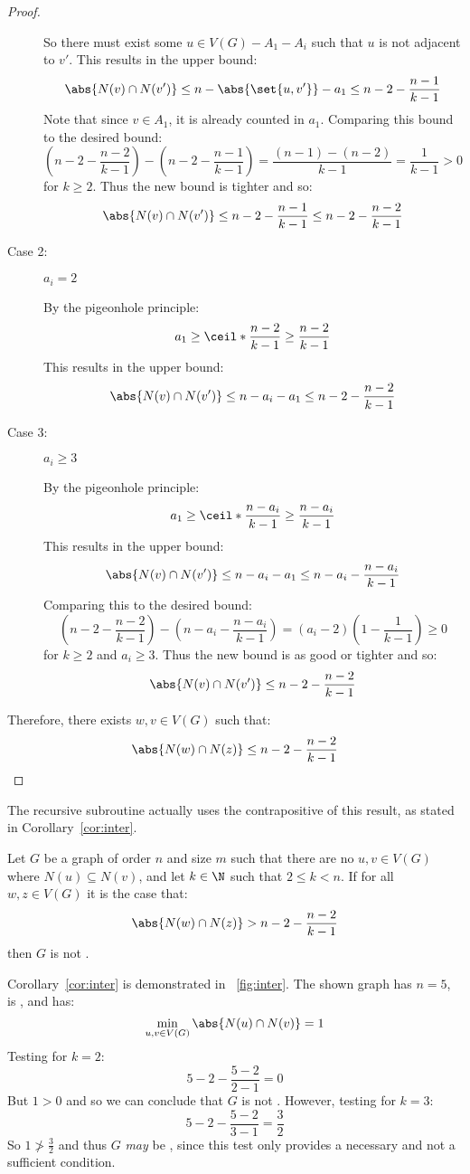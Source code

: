 \begin{proof}
\begin{description}
    So there must exist some \(u\in V(G)-A_1-A_i\) such that \(u\) is not adjacent to \(v'\).  This results in the
    upper bound:
    \[\abs{N(v)\cap N(v')}\le n-\abs{\set{u,v'}}-a_1\le n-2-\frac{n-1}{k-1}\]
    Note that since \(v\in A_1\), it is already counted in \(a_1\).  Comparing this bound to the desired bound:
    \[\left(n-2-\frac{n-2}{k-1}\right)-\left(n-2-\frac{n-1}{k-1}\right)=\frac{(n-1)-(n-2)}{k-1}=\frac{1}{k-1}>0\]
    for \(k\ge2\).  Thus the new bound is tighter and so:
    \[\abs{N(v)\cap N(v')}\le n-2-\frac{n-1}{k-1}\le n-2-\frac{n-2}{k-1}\]
    
  \item [Case 2:] \(a_i=2\)

    By the pigeonhole principle:
    \[a_1\ge\ceil*{\frac{n-2}{k-1}}\ge\frac{n-2}{k-1}\]
    This results in the upper bound:
    \[\abs{N(v)\cap N(v')}\le n-a_i-a_1\le n-2-\frac{n-2}{k-1}\]
    
  \item [Case 3:] \(a_i\ge3\)

    By the pigeonhole principle:
    \[a_1\ge\ceil*{\frac{n-a_i}{k-1}}\ge\frac{n-a_i}{k-1}\]
    This results in the upper bound:
    \[\abs{N(v)\cap N(v')}\le n-a_i-a_1\le n-a_i-\frac{n-a_i}{k-1}\]
    Comparing this to the desired bound:
    \[\left(n-2-\frac{n-2}{k-1}\right)-\left(n-a_i-\frac{n-a_i}{k-1}\right)=(a_i-2)\left(1-\frac{1}{k-1}\right)\ge0\]
    for \(k\ge2\) and \(a_i\ge3\).  Thus the new bound is as good or tighter and so:
    \[\abs{N(v)\cap N(v')}\le n-2-\frac{n-2}{k-1}\]
  \end{description}

  Therefore, there exists \(w,v\in V(G)\) such that:
  \[\abs{N(w)\cap N(z)}\le n-2-\frac{n-2}{k-1}\]
\end{proof}

The recursive subroutine actually uses the contrapositive of this result, as stated in Corollary~\ref{cor:inter}.

\begin{corollary}
  \label{cor:inter}
  Let \(G\) be a graph of order \(n\) and size \(m\) such that there are no \(u,v\in V(G)\) where
  \(N(u)\subseteq N(v)\), and let \(k\in\N\) such that \(2\le k<n\).  If for all \(w,z\in V(G)\) it is the case
  that:
  \[\abs{N(w)\cap N(z)}>n-2-\frac{n-2}{k-1}\]
  then \(G\) is not .
\end{corollary}

Corollary~\ref{cor:inter} is demonstrated in \figurename~\ref{fig:inter}.  The shown graph has \(n=5\), is
, and has:
\[\min_{u,v\in V(G)}\abs{N(u)\cap N(v)}=1\]
Testing for \(k=2\):
\[5-2-\frac{5-2}{2-1}=0\]
But \(1>0\) and so we can conclude that \(G\) is not .  However, testing for \(k=3\):
\[5-2-\frac{5-2}{3-1}=\frac{3}{2}\]
So \(1\ngtr\frac{3}{2}\) and thus \(G\) \emph{may} be , since this test only provides a necessary and
not a sufficient condition.

